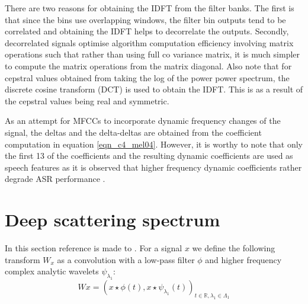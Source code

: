 There are two reasons for obtaining the IDFT from the filter banks.  The first is that since the bins use overlapping windows, the filter bin outputs tend to be correlated and obtaining the IDFT helps to decorrelate the outputs.  Secondly, decorrelated signals optimise algorithm computation efficiency involving matrix operations such that rather than using full co variance matrix, it is much simpler to compute the matrix operations from the matrix diagonal.  Also note that for cepstral values obtained from taking the log of the power power spectrum, the discrete cosine transform (DCT) is used to obtain the IDFT.  This is as a result of the cepstral values being real and symmetric\citep{gales2008application}.

As an attempt for MFCCs to incorporate dynamic frequency changes of the signal, the deltas and the delta-deltas are obtained from the coefficient computation in equation \ref{eqn_c4_mel04}.  However, it is worthy to note that only the first 13 of the coefficients and the resulting dynamic coefficients are used as speech features as it is observed that higher frequency dynamic coefficients rather degrade ASR performance \citep{gales2008application}.

\section{Deep scattering spectrum}\label{sec_c5_wproof}
In this section reference is made to \citep{anden2011multiscale, anden2014deep, zeghidour2016deep}. For a signal $x$ we define the following transform $W_x$ as a convolution with a low-pass filter $\phi$ and higher frequency complex analytic wavelets $\psi_{\lambda_1}$:
\begin{equation}
Wx=(x\star\phi(t),x\star\psi_{\lambda_1}(t))_{t\in\mathbb{R},\lambda_1\in\Lambda_1} \label{eqn_c4_dss01}
\end{equation}

